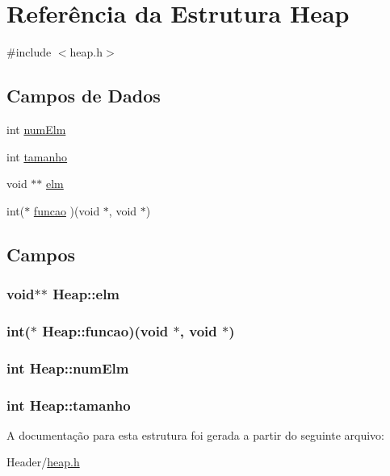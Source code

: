 \hypertarget{structHeap}{
\section{Referência da Estrutura Heap}
\label{structHeap}
}


{\ttfamily \#include $<$heap.h$>$}

\subsection*{Campos de Dados}
\begin{DoxyCompactItemize}
\item 
int \hyperlink{structHeap_a4aea0da617a8956dacb0eb0e64174f3a}{numElm}
\item 
int \hyperlink{structHeap_a6014ac64cf157267d0596017a787bc6c}{tamanho}
\item 
void $\ast$$\ast$ \hyperlink{structHeap_af29d52c8a951a5412361d731f24e0bf7}{elm}
\item 
int($\ast$ \hyperlink{structHeap_a9e90b16514bf5f86e116fa9bdf492bda}{funcao} )(void $\ast$, void $\ast$)
\end{DoxyCompactItemize}


\subsection{Campos}
\hypertarget{structHeap_af29d52c8a951a5412361d731f24e0bf7}{
\subsubsection[{elm}]{\setlength{\rightskip}{0pt plus 5cm}void$\ast$$\ast$ {\bf Heap::elm}}}
\label{structHeap_af29d52c8a951a5412361d731f24e0bf7}
\hypertarget{structHeap_a9e90b16514bf5f86e116fa9bdf492bda}{
\subsubsection[{funcao}]{\setlength{\rightskip}{0pt plus 5cm}int($\ast$ {\bf Heap::funcao})(void $\ast$, void $\ast$)}}
\label{structHeap_a9e90b16514bf5f86e116fa9bdf492bda}
\hypertarget{structHeap_a4aea0da617a8956dacb0eb0e64174f3a}{
\subsubsection[{numElm}]{\setlength{\rightskip}{0pt plus 5cm}int {\bf Heap::numElm}}}
\label{structHeap_a4aea0da617a8956dacb0eb0e64174f3a}
\hypertarget{structHeap_a6014ac64cf157267d0596017a787bc6c}{
\subsubsection[{tamanho}]{\setlength{\rightskip}{0pt plus 5cm}int {\bf Heap::tamanho}}}
\label{structHeap_a6014ac64cf157267d0596017a787bc6c}


A documentação para esta estrutura foi gerada a partir do seguinte arquivo:\begin{DoxyCompactItemize}
\item 
Header/\hyperlink{heap_8h}{heap.h}\end{DoxyCompactItemize}
